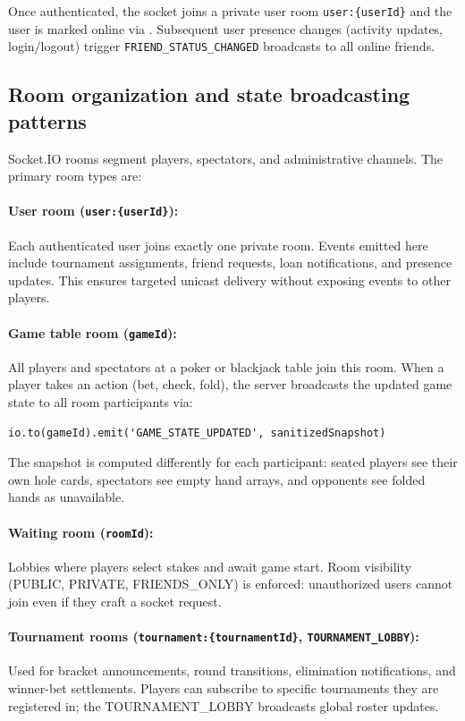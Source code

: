 \documentclass[11pt,a4paper]{article}
\begin{document}
Once authenticated, the socket joins a private user room \texttt{user:\{userId\}} and the user is marked online via . Subsequent user presence changes (activity updates, login/logout) trigger \texttt{FRIEND\_STATUS\_CHANGED} broadcasts to all online friends.

\subsection{Room organization and state broadcasting patterns}

Socket.IO rooms segment players, spectators, and administrative channels. The primary room types are:

\paragraph{User room (\texttt{user:\{userId\}}):} Each authenticated user joins exactly one private room. Events emitted here include tournament assignments, friend requests, loan notifications, and presence updates. This ensures targeted unicast delivery without exposing events to other players.

\paragraph{Game table room (\texttt{gameId}):} All players and spectators at a poker or blackjack table join this room. When a player takes an action (bet, check, fold), the server broadcasts the updated game state to all room participants via:

\begin{verbatim}
io.to(gameId).emit('GAME_STATE_UPDATED', sanitizedSnapshot)
\end{verbatim}

\noindent The snapshot is computed differently for each participant: seated players see their own hole cards, spectators see empty hand arrays, and opponents see folded hands as unavailable.

\paragraph{Waiting room (\texttt{roomId}):} Lobbies where players select stakes and await game start. Room visibility (PUBLIC, PRIVATE, FRIENDS\_ONLY) is enforced: unauthorized users cannot join even if they craft a socket request.

\paragraph{Tournament rooms (\texttt{tournament:\{tournamentId\}}, \texttt{TOURNAMENT\_LOBBY}):} Used for bracket announcements, round transitions, elimination notifications, and winner-bet settlements. Players can subscribe to specific tournaments they are registered in; the TOURNAMENT\_LOBBY broadcasts global roster updates.
\end{document}

